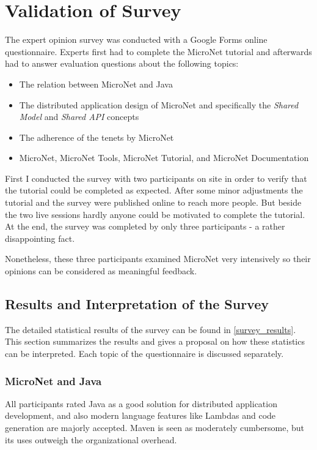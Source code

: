 \section{Validation of Survey}
\label{sec:validation_survey}

The expert opinion survey was conducted with a Google Forms online
questionnaire. Experts first had to complete the MicroNet tutorial and
afterwards had to answer evaluation questions about the following topics:

\begin{itemize}
  \item The relation between MicroNet and Java
  \item The distributed application design of MicroNet and specifically the
  \textit{Shared Model} and \textit{Shared API} concepts
  \item The adherence of the \ms{} tenets by MicroNet
  \item MicroNet, MicroNet Tools, MicroNet Tutorial, and MicroNet Documentation
\end{itemize}

First I conducted the survey with two participants on site in order to verify
that the tutorial could be completed as expected. After some minor adjustments the
tutorial and the survey were published online to reach more people. But beside
the two live sessions hardly anyone could be motivated to complete the tutorial.
At the end, the survey was completed by only three participants - a rather
disappointing fact.

Nonetheless, these three participants examined MicroNet very intensively so
their opinions can be considered as meaningful feedback.

\subsection{Results and Interpretation of the Survey}

The detailed statistical results of the survey can be found in
\autoref{survey_results}. This section summarizes the results and gives a
proposal on how these statistics can be interpreted. Each topic of the
questionnaire is discussed separately.

\subsubsection{MicroNet and Java}

All participants rated Java as a good solution for distributed application
development, and also modern language features like Lambdas and code generation
are majorly accepted. Maven is seen as moderately cumbersome, but its uses
outweigh the organizational overhead.

